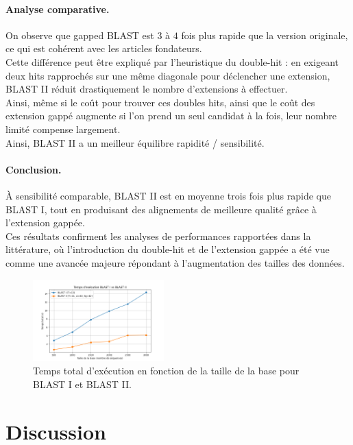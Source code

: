 \documentclass[conference]{IEEEtran}
\begin{document}
\paragraph*{Analyse comparative.}
On observe que gapped BLAST est $3$ à $4$ fois plus rapide que la version originale, ce qui est cohérent avec les articles fondateurs.\\
Cette différence peut être expliqué par l’heuristique du double-hit : en exigeant deux hits rapprochés sur une même diagonale pour déclencher une extension, BLAST II réduit drastiquement le nombre d’extensions à effectuer.\\
Ainsi, même si le coût pour trouver ces doubles hits, ainsi que le coût des extension gappé augmente si l'on prend un seul candidat à la fois, leur nombre limité compense largement.\\
Ainsi, BLAST II a un meilleur équilibre rapidité / sensibilité.

\paragraph*{Conclusion.}
À sensibilité comparable, BLAST II est en moyenne trois fois plus rapide que BLAST I, tout en produisant des alignements de meilleure qualité grâce à l’extension gappée.\\
Ces résultats confirment les analyses de performances rapportées dans la littérature, où l’introduction du double-hit et de l’extension gappée a été vue comme une avancée majeure répondant à l'augmentation des tailles des données.

\begin{figure}
    \centering
    \includegraphics[width=0.45\textwidth]{test_temps.png}
    \caption{Temps total d’exécution en fonction de la taille de la base
    pour BLAST I et BLAST II.}
    \label{fig:time_vs_dbsize}
\end{figure}

\section{Discussion}
\end{document}
